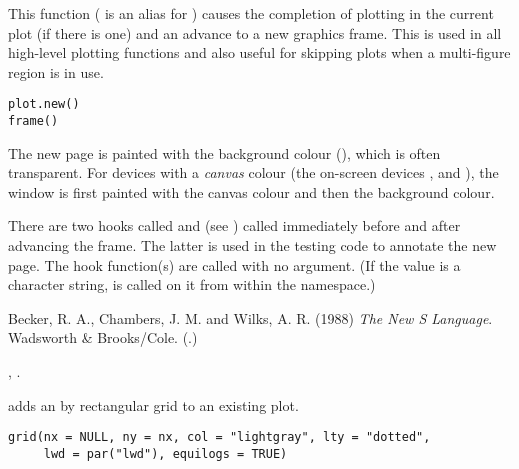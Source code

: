 %
\begin{Description}\relax
This function ( is an alias for
) causes the completion of plotting in the current plot
(if there is one) and an advance to a new graphics frame.  This is
used in all high-level plotting functions and also useful for skipping
plots when a multi-figure region is in use.
\end{Description}
%
\begin{Usage}
\begin{verbatim}
plot.new()
frame()
\end{verbatim}
\end{Usage}
%
\begin{Details}\relax
The new page is painted with the background colour
(), which is often transparent.  For devices
with a \emph{canvas} colour (the on-screen devices ,
 and ), the window is first painted with the
canvas colour and then the background colour.

There are two hooks called  and
 (see ) called immediately
before and after advancing the frame. The latter is used
in the testing code to annotate the new page. The hook function(s) are
called with no argument.  (If the value is a character string,
 is called on it from within the  namespace.)
\end{Details}
%
\begin{References}\relax
Becker, R. A., Chambers, J. M. and Wilks, A. R. (1988)
\emph{The New S Language}.
Wadsworth \& Brooks/Cole. (.)
\end{References}
%
\begin{SeeAlso}\relax
{}, .
\end{SeeAlso}
%
\begin{Description}\relax
{} adds an  by  rectangular grid to an
existing plot.
\end{Description}
%
\begin{Usage}
\begin{verbatim}
grid(nx = NULL, ny = nx, col = "lightgray", lty = "dotted",
     lwd = par("lwd"), equilogs = TRUE)
\end{verbatim}
\end{Usage}
